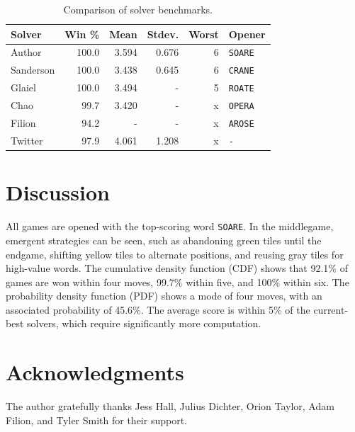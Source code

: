 \documentclass[twocolumn]{tudelft-aiaa}
\begin{document}
\begin{table}[h!]
\begin{centering}
\setlength\tabcolsep{3pt} %
\begin{tabular}{l || r | r | r | r | l}
\bf Solver & \bf Win \% & \bf Mean & \bf Stdev. & \bf Worst & \bf Opener\\
\hline \hline
Author\cite{Dichter} & 100.0 & 3.594 & 0.676 & 6 & \texttt{SOARE}\\ \hline
Sanderson\cite{Sanderson} & 100.0 & 3.438 & 0.645 & 6 & \texttt{CRANE}\\
Glaiel\cite{Glaiel} & 100.0 & 3.494 & - & 5 & \texttt{ROATE}\\
Chao\cite{Chao} & 99.7 & 3.420 & - & x & \texttt{OPERA}\\
Filion\cite{Filion} & 94.2 & - & - & x & \texttt{AROSE}\\
Twitter\cite{WordleStats} & 97.9 & 4.061 & 1.208 & x & \texttt{-}\\
\end{tabular}
\vspace{2 mm}
\caption{Comparison of solver benchmarks.}
\label{other_solvers}
\end{centering}
\end{table}

\pagebreak

\section{Discussion}

All games are opened with the top-scoring word \texttt{SOARE}. In the middlegame, emergent strategies can be seen, such as abandoning green tiles until the endgame, shifting yellow tiles to alternate positions, and reusing gray tiles for high-value words. The cumulative density function (CDF) shows that 92.1\% of games are won within four moves, 99.7\% within five, and 100\% within six. The probability density function (PDF) shows a mode of four moves, with an associated probability of 45.6\%. The average score is within 5\% of the current-best solvers, which require significantly more computation.

\section{Acknowledgments}

The author gratefully thanks Jess Hall, Julius Dichter, Orion Taylor, Adam Filion, and Tyler Smith for their support.
\end{document}
